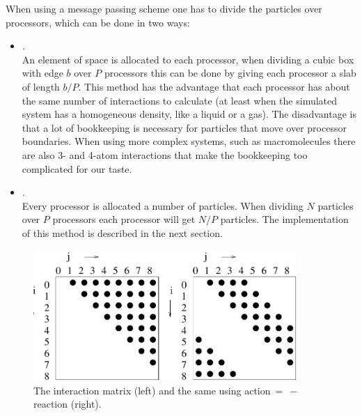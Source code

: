 When using a message passing scheme one has to divide the particles 
over processors, which can be done in two ways:
\begin{itemize}
\item   {\em {}.}\\
        An element of space is allocated to each processor, when dividing
        a cubic box with edge $b$ over $P$ processors this can be done 
        by giving
        each processor a slab of length $b/P$. This method 
        has the advantage
        that each processor has about the same number of interactions
        to calculate (at least when the simulated system has a homogeneous
        density, like a liquid or a gas). The disadvantage is that a lot of
        bookkeeping is necessary for particles that move over processor
        boundaries. When using more complex systems, such as macromolecules there
        are also 3- and 4-atom interactions that make 
  	the bookkeeping too complicated for our taste.
\item   {\em {}.}\\
        Every processor is allocated a number of particles. When
        dividing $N$ particles over $P$ processors each processor will
        get $N/P$ particles. The implementation of this method
        is described in the next section.
\end{itemize}

\begin {figure}[p]
\centerline{\includegraphics[width=10cm]{plots/int-mat}}
\caption[The interaction matrix.]{The interaction matrix (left) and
the same using action$~=~-$reaction (right).}
\label{fig:int_mat}
\end {figure}

